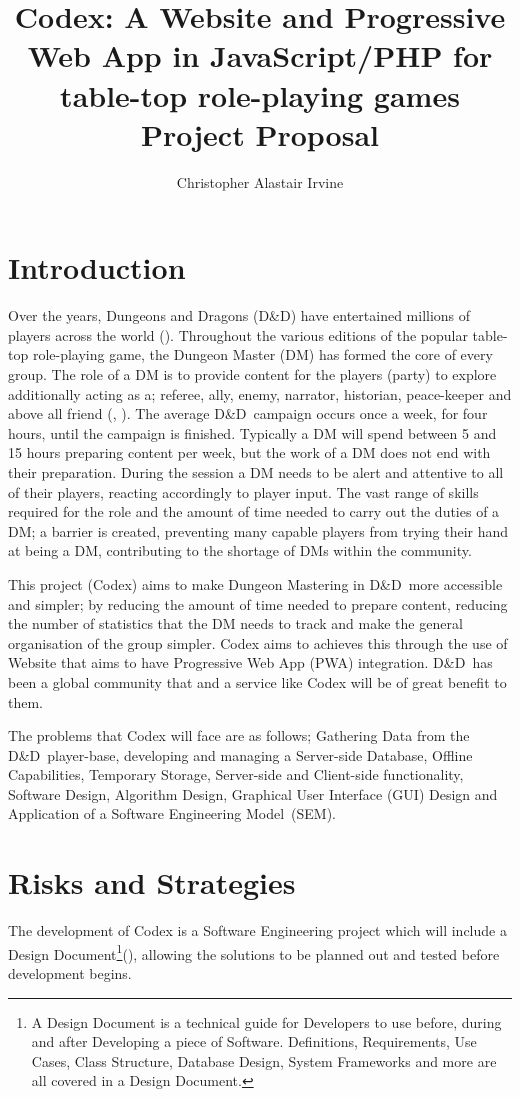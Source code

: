 \documentclass[proposal]{cmpreport}
\title{Codex: A Website and Progressive Web App in JavaScript/PHP for table-top role-playing games \\ Project Proposal}
\author{Christopher Alastair Irvine}
\newcommand{\dnd}{D\&D}
\newcommand{\sem}{Software Engineering Model}
\begin{document}
	\section{Introduction}
	
	Over the years, Dungeons and Dragons (\dnd) have entertained millions of players across the world (\cite{DnDOriginal}). Throughout the various editions of the popular table-top role-playing game, the Dungeon Master (DM) has formed the core of every group. The role of a DM is to provide content for the players (party) to explore additionally acting as a; referee, ally, enemy, narrator, historian, peace-keeper and above all friend (\cite{DnDPeople}, \cite{DungeonMaster}). The average \dnd \ campaign occurs once a week, for four hours, until the campaign is finished. Typically a DM will spend between 5 and 15 hours preparing content per week, but the work of a DM does not end with their preparation. During the session a DM needs to be alert and attentive to all of their players, reacting accordingly to player input. The vast range of skills required for the role and the amount of time needed to carry out the duties of a DM; a barrier is created, preventing many capable players from trying their hand at being a DM, contributing to the shortage of DMs within the community.
	
	This project (Codex) aims to make Dungeon Mastering in \dnd \ more accessible and simpler; by reducing the amount of time needed to prepare content, reducing the number of statistics that the DM needs to track and make the general organisation of the group simpler. Codex aims to achieves this through the use of Website that aims to have Progressive Web App (PWA) integration. \dnd \ has been a global community that and a service like Codex will be of great benefit to them. 
	
	The problems that Codex will face are as follows; Gathering Data from the \dnd \ player-base, developing and managing a Server-side Database, Offline Capabilities, Temporary Storage, Server-side and Client-side functionality, Software Design, Algorithm Design, Graphical User Interface (GUI) Design and Application of a \sem \ (SEM).

	\section{Risks and Strategies}
	The development of Codex is a Software Engineering project which will include a Design Document\footnote{A Design Document is a technical guide for Developers to use before, during and after Developing a piece of Software. Definitions, Requirements, Use Cases, Class Structure, Database Design, System Frameworks and more are all covered in a Design Document.}(\cite{DesignDocExample}), allowing the solutions to be planned out and tested before development begins.
	
\end{document}
